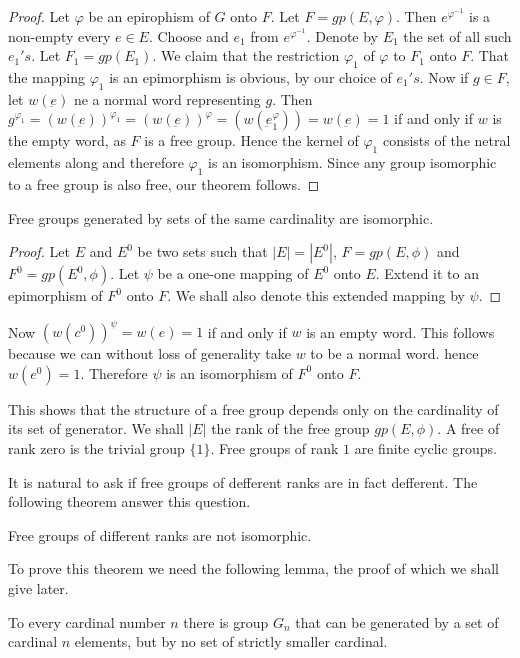 \begin{proof}
  Let $\varphi$ be an epirophism of $G$ onto $F$. Let
  $F=gp(E,\varphi)$. Then $e^{\varphi^{-1}}$ is a non-empty every $e
  \in E$. Choose and $e_1$ from $e^{\varphi^{-1}}$. Denote by $E_1$
  the set of all such $e_1's$. Let $F_1=gp(E_1)$. We claim that the
  restriction $\varphi_1$ of $\varphi$ to $F_1$ onto $F$. That the
  mapping $\varphi_1$ is an epimorphism is obvious, by our choice of
  $e_1's$. Now if $g \in F$, let $w(\underbar{e})$ ne a normal word
  representing $g$. Then
  $g^{\varphi_1}=(w(\underbar{e}))^{\varphi_1}=(w(\underbar{e}))^{\varphi}=(w(\underbar{e}^\varphi
  _1))=w(\underbar{e})=1$ if and only if $w$ is the empty word, as $F$
  is a free group. Hence the kernel of $\varphi _1$ consists of the
  netral elements along and therefore $\varphi_1$ is an
  isomorphism. Since any group isomorphic to a free group is also
  free, our theorem follows. 
\end{proof}

\begin{Theorem}%
  Free groups generated by sets of the same cardinality are isomorphic.
\end{Theorem}

\begin{proof}
  Let $E$ and $E^0$ be two sets such that $|E|=|E^0|$, $F=gp(E,\phi)$
  and $F^0=gp(E^0, \phi)$. Let $\psi$ be a one-one mapping of $E^0$
  onto $E$. Extend it to an epimorphism of $F^0$ onto $F$. We shall
  also denote this extended mapping by $\psi$. 
\end{proof}

Now $(w(c^0))^\psi=w(e)=1$ if and only if $w$ is an empty word. This
follows because we can without loss of generality take $w$ to be a
normal word. hence $w(e^0)=1$. Therefore $\psi$ is an isomorphism of
$F^0$ onto $F$. 

This shows that the structure of a free group depends only on the
cardinality of its set of generator. We shall $|E|$ the rank of the
free group $gp(E, \phi)$. A free of rank zero is the trivial group $\{
1 \}$. Free groups of rank $1$ are finite cyclic groups. 

It is natural to ask if free groups of defferent ranks are in fact
defferent. The following theorem answer this question. 
\begin{Theorem} %
  Free groups of different ranks are not isomorphic.
\end{Theorem}

To prove this theorem we need the following lemma, the proof of which
we shall give later. 
\begin{lemma}
  To every cardinal number $n$ there is group $G_n$ that can be
  generated by a set of cardinal $n$ elements, but by no set of
  strictly smaller cardinal. 
\end{lemma}


